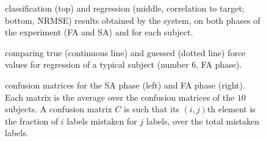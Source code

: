 \documentclass[10pt]{bmc_article}
\def\texttt{[image: ]}
\newenvironment{bmcformat}
  {\begin{raggedright}\baselineskip20pt\sloppy\setboolean{publ}{false}}
  {\end{raggedright}\baselineskip20pt\sloppy}
\begin{document}
\begin{bmcformat}

\begin{figure}[!ht] \centering
  \caption{classification (top) and regression (middle, correlation to target;
    bottom, NRMSE) results obtained by the system, on both phases of the
    experiment (FA and SA) and for each subject.}
  \label{fig:results}
\end{figure}

\begin{figure}[!ht] \centering
  \caption{comparing true (continuous line) and guessed (dotted line) force values for regression of a
    typical subject (number $6$, FA phase).}
  \label{fig:examples}
\end{figure}

\begin{figure*}[!ht] \centering
  \caption{confusion matrices for the SA phase (left) and FA phase (right). Each matrix
           is the average over the confusion matrices of the $10$ subjects. A confusion
           matrix $C$ is such that its $(i,j)$th element is the fraction of $i$ labels
           mistaken for $j$ labels, over the total mistaken labels.}
  \label{fig:confusion}
\end{figure*}


\end{bmcformat}
\end{document}
